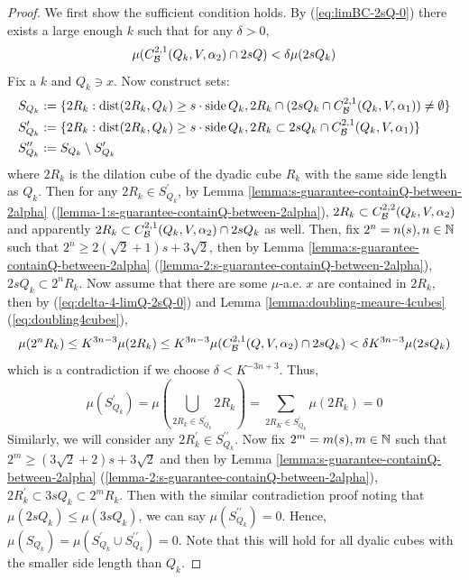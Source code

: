 \begin{proof}
    We first show the sufficient condition holds. By (\ref{eq:limBC-2sQ-0}) there exists a large enough $k$ such that for any $\delta>0$,
    \begin{equation}
        \mu(C_\mathcal B^{2,1}(Q_k, V, \alpha_2)\cap 2sQ) < \delta\mu(2sQ_k)
    \end{equation}
    Fix a $k$ and $Q_k\ni x$. Now construct sets:
    \begin{equation*}
        \begin{split}
            S_{Q_k} &:= \{2R_k: \operatorname{dist}(2R_k, Q_k)\geq s\cdot\operatorname{side} Q_k, 2R_k\cap(2sQ_k\cap C_\mathcal B^{2, 1} (Q_k, V, \alpha_1))\neq \emptyset\} \\
            S_{Q_k}^\prime &:= \{2R_k: \operatorname{dist}(2R_k, Q_k)\geq s\cdot\operatorname{side} Q_k, 2R_k\subset 2sQ_k\cap C_\mathcal B^{2, 1} (Q_k, V, \alpha_1)\} \\
            S_{Q_k}^{\prime\prime} &:= S_{Q_k} \setminus S_{Q_k}^\prime
        \end{split}
    \end{equation*}
    where $2R_k$ is the dilation cube of the dyadic cube $R_k$ with the same side length as $Q_k$. Then for any $2R_k\in S_{Q_k}^\prime$, by Lemma \ref{lemma:s-guarantee-containQ-between-2alpha} (\ref{lemma-1:s-guarantee-containQ-between-2alpha}), $2R_k\subset  C_\mathcal B^{2,2}(Q_k, V, \alpha_2)$ and apparently $2R_k\subset  C_\mathcal B^{2,1}(Q_k, V, \alpha_2)\cap 2sQ_k$ as well. Then, fix $2^n=n(s), n\in\mathbb{N}$ such that $2^n\geq 2(\sqrt{2}+1)s + 3\sqrt{2}$, then by Lemma \ref{lemma:s-guarantee-containQ-between-2alpha} (\ref{lemma-2:s-guarantee-containQ-between-2alpha}), $2sQ_k\subset 2^n R_k$. Now assume that there are some $\mu$-a.e. $x$ are contained in $2R_k$, then by (\ref{eq:delta-4-limQ-2sQ-0}) and Lemma \ref{lemma:doubling-meaure-4cubes} (\ref{eq:doubling4cubes}), 
    \begin{equation*}
        \mu(2^n R_k)\leq K^{3n-3}\mu(2R_k)\leq K^{3n-3}\mu(C_\mathcal B^{2,1}(Q, V, \alpha_2)\cap 2sQ_k) < \delta K^{3n-3} \mu(2sQ_k)
    \end{equation*}
    which is a contradiction if we choose $\delta<K^{-3n+3}$. Thus, 
    \begin{equation*}
        \mu(S_{Q_k}^\prime) = \mu(\bigcup_{2R_k\in S_{Q_k}^\prime} 2R_k)=\sum_{2R_K \in S^\prime_{Q_k}}\mu(2R_k)=0
    \end{equation*}
    Similarly, we will consider any $2R_k^\prime\in S^{\prime\prime}_{Q_k}$. Now fix $2^m = m(s), m\in\mathbb{N}$ such that $2^m \geq (3\sqrt{2}+2)s + 3\sqrt{2}$ and then by Lemma \ref{lemma:s-guarantee-containQ-between-2alpha} (\ref{lemma-2:s-guarantee-containQ-between-2alpha}), $2R_k^\prime \subset  3sQ_k \subset 2^m R_k$. Then with the similar contradiction proof noting that $\mu(2sQ_k)\leq \mu(3sQ_k)$, we can say $\mu(S_{Q_k}^{\prime\prime})=0$. Hence, $\mu(S_{Q_k}) = \mu(S_{Q_k}^\prime \cup S_{Q_k}^{\prime\prime}) = 0$. {\color{red}Note that this will hold for all dyalic cubes with the smaller side length than $Q_k$.}
    

\end{proof}
